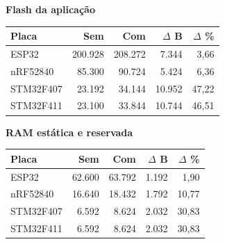 \begin{minipage}{.49\textwidth}
\centering
\textbf{Flash da aplicação}\par\smallskip
\begin{tabular}{lrrrr}
\hline
Placa & Sem & Com & $\Delta$ B & $\Delta$ \% \\
\hline
ESP32 & 200.928 & 208.272 & 7.344 & 3,66 \\
nRF52840 & 85.300 & 90.724 & 5.424 & 6,36 \\
STM32F407 & 23.192 & 34.144 & 10.952 & 47,22 \\
STM32F411 & 23.100 & 33.844 & 10.744 & 46,51 \\
\hline
\end{tabular}
\end{minipage}
\hfill
\begin{minipage}{.49\textwidth}
\centering
\textbf{RAM estática e reservada}\par\smallskip
\begin{tabular}{lrrrr}
\hline
Placa & Sem & Com & $\Delta$ B & $\Delta$ \% \\
\hline
ESP32 & 62.600 & 63.792 & 1.192 & 1,90 \\
nRF52840 & 16.640 & 18.432 & 1.792 & 10,77 \\
STM32F407 & 6.592 & 8.624 & 2.032 & 30,83 \\
STM32F411 & 6.592 & 8.624 & 2.032 & 30,83 \\
\hline
\end{tabular}
\end{minipage}
